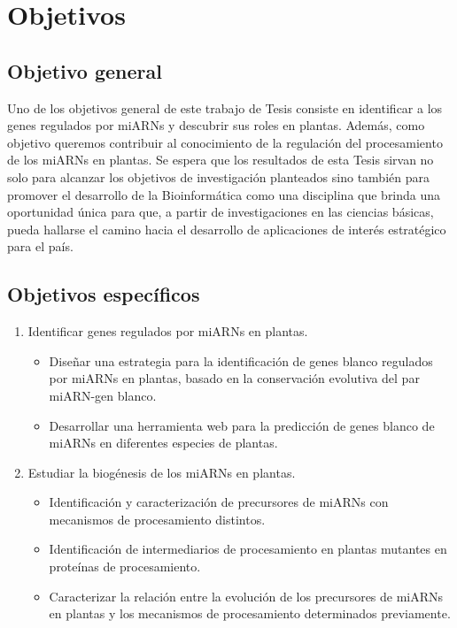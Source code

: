 \setcounter{chapter}{2}
\chapter*{Objetivos} 
\setcounter{figure}{0}
\setcounter{section}{0}

\section{Objetivo general} 

Uno de los objetivos general de este trabajo de Tesis consiste en identificar a los genes regulados por miARNs y descubrir sus roles en plantas.
Además, como objetivo queremos contribuir al conocimiento de la regulación del procesamiento de los miARNs en plantas.
Se espera que los resultados de esta Tesis sirvan no solo para alcanzar los objetivos de investigación planteados sino también para promover el desarrollo de la Bioinformática como una disciplina que brinda una oportunidad única para que, a partir de investigaciones en las ciencias básicas, pueda hallarse el camino hacia el desarrollo de aplicaciones de interés estratégico para el país.

\section{Objetivos específicos}

\begin{enumerate}
    \item Identificar genes regulados por miARNs en plantas.
    \begin{itemize}
        \item Diseñar una estrategia para la identificación de genes blanco regulados por miARNs en plantas, basado en la conservación evolutiva del par miARN-gen blanco.
        \item Desarrollar una herramienta web para la predicción de genes blanco de miARNs en diferentes especies de plantas.		
    \end{itemize}
    \item Estudiar la biogénesis de los miARNs en plantas.
    \begin{itemize}
		\item Identificación y caracterización de precursores de miARNs con mecanismos de procesamiento distintos.
		\item Identificación de intermediarios de procesamiento en plantas mutantes en proteínas de procesamiento.
        \item Caracterizar la relación entre la evolución de los precursores de miARNs en plantas y los mecanismos de procesamiento determinados previamente.
    \end{itemize}
\end{enumerate}
